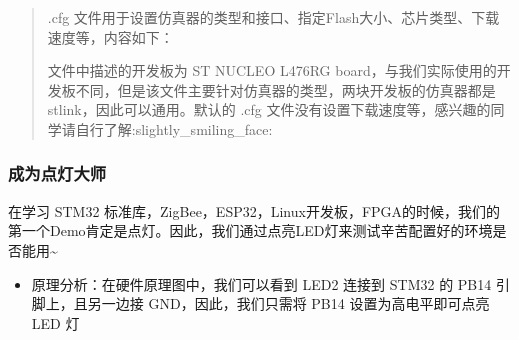 \documentclass[a4paper,12pt,english]{sphinxmanual}
\begin{document}
\sphinxAtStartPar
{}
\begin{quote}

\sphinxAtStartPar
.cfg 文件用于设置仿真器的类型和接口、指定Flash大小、芯片类型、下载速度等，内容如下：

\begin{sphinxVerbatim}[commandchars=\\\{\}]

 \PYG{p}{[} \PYG{p}{]}

  

 \PYG{p}{[} \PYG{p}{]}

  
\end{sphinxVerbatim}

\sphinxAtStartPar
文件中描述的开发板为 ST NUCLEO L476RG board，与我们实际使用的开发板不同，但是该文件主要针对仿真器的类型，两块开发板的仿真器都是 stlink，因此可以通用。默认的 .cfg 文件没有设置下载速度等，感兴趣的同学请自行了解:slightly\_smiling\_face:
\end{quote}


\subsubsection{成为点灯大师}
\label{\detokenize{exp-stm32/ide-setup:id10}}
\sphinxAtStartPar
在学习 STM32 标准库，ZigBee，ESP32，Linux开发板，FPGA的时候，我们的第一个Demo肯定是点灯。因此，我们通过点亮LED灯来测试辛苦配置好的环境是否能用\textasciitilde{}
\begin{itemize}
\item {} 
\sphinxAtStartPar
原理分析：在硬件原理图中，我们可以看到 LED2 连接到 STM32 的 PB14 引脚上，且另一边接 GND，因此，我们只需将 PB14 设置为高电平即可点亮 LED 灯

\end{itemize}

\sphinxAtStartPar
{}
\end{document}

